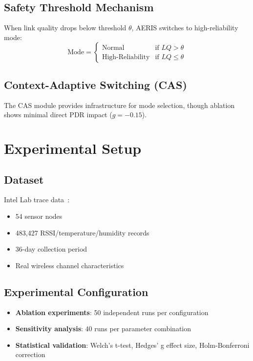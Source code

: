 \documentclass[11pt,a4paper]{article}
\begin{document}
\subsection{Safety Threshold Mechanism}

When link quality drops below threshold $\theta$, AERIS switches to high-reliability mode:
\begin{equation}
\text{Mode} = \begin{cases}
\text{Normal} & \text{if } LQ > \theta \\
\text{High-Reliability} & \text{if } LQ \leq \theta
\end{cases}
\end{equation}

\subsection{Context-Adaptive Switching (CAS)}

The CAS module provides infrastructure for mode selection, though ablation shows minimal direct PDR impact ($g=-0.15$).

\section{Experimental Setup}

\subsection{Dataset}

Intel Lab trace data~\cite{IntelLabData2004}:
\begin{itemize}
    \item 54 sensor nodes
    \item 483,427 RSSI/temperature/humidity records
    \item 36-day collection period
    \item Real wireless channel characteristics
\end{itemize}

\subsection{Experimental Configuration}

\begin{itemize}
    \item \textbf{Ablation experiments}: 50 independent runs per configuration
    \item \textbf{Sensitivity analysis}: 40 runs per parameter combination
    \item \textbf{Statistical validation}: Welch's t-test, Hedges' g effect size, Holm-Bonferroni correction
\end{itemize}
\end{document}
